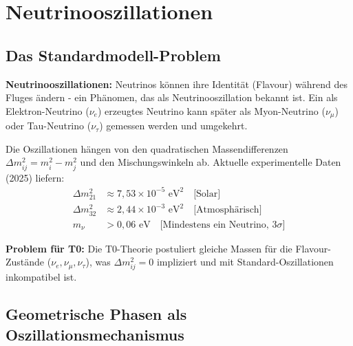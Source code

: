 	\section{Neutrinooszillationen}
	
	\subsection{Das Standardmodell-Problem}
	
	\begin{warning}
		\textbf{Neutrinooszillationen:} Neutrinos können ihre Identität (Flavour) während des Fluges ändern - ein Phänomen, das als Neutrinooszillation bekannt ist. Ein als Elektron-Neutrino ($\nu_e$) erzeugtes Neutrino kann später als Myon-Neutrino ($\nu_\mu$) oder Tau-Neutrino ($\nu_\tau$) gemessen werden und umgekehrt.
		
		Die Oszillationen hängen von den quadratischen Massendifferenzen $\Delta m^2_{ij} = m_i^2 - m_j^2$ und den Mischungswinkeln ab. Aktuelle experimentelle Daten (2025) liefern:
		\begin{align}
			\Delta m^2_{21} &\approx 7,53 \times 10^{-5} \text{ eV}^2 \quad \text{[Solar]} \\
			\Delta m^2_{32} &\approx 2,44 \times 10^{-3} \text{ eV}^2 \quad \text{[Atmosphärisch]} \\
			m_\nu &> 0,06 \text{ eV} \quad \text{[Mindestens ein Neutrino, 3}\sigma\text{]}
		\end{align}
		
		\textbf{Problem für T0:}
		Die T0-Theorie postuliert gleiche Massen für die Flavour-Zustände ($\nu_e, \nu_\mu, \nu_\tau$), was $\Delta m^2_{ij} = 0$ impliziert und mit Standard-Oszillationen inkompatibel ist.
	\end{warning}
	
	\subsection{Geometrische Phasen als Oszillationsmechanismus}
	
